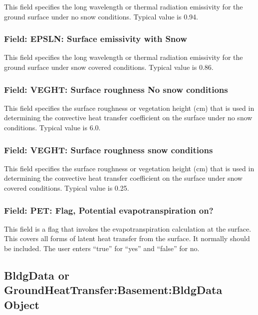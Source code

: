 This field specifies the long wavelength or thermal radiation emissivity for the ground surface under no snow conditions. Typical value is 0.94.

\subsubsection{Field: EPSLN: Surface emissivity with Snow}\label{field-epsln-surface-emissivity-with-snow}

This field specifies the long wavelength or thermal radiation emissivity for the ground surface under snow covered conditions. Typical value is 0.86.

\subsubsection{Field: VEGHT: Surface roughness No snow conditions}\label{field-veght-surface-roughness-no-snow-conditions}

This field specifies the surface roughness or vegetation height (cm) that is used in determining the convective heat transfer coefficient on the surface under no snow conditions. Typical value is 6.0.

\subsubsection{Field: VEGHT: Surface roughness snow conditions}\label{field-veght-surface-roughness-snow-conditions}

This field specifies the surface roughness or vegetation height (cm) that is used in determining the convective heat transfer coefficient on the surface under snow covered conditions. Typical value is 0.25.

\subsubsection{Field: PET: Flag, Potential evapotranspiration on?}\label{field-pet-flag-potential-evapotranspiration-on}

This field is a flag that invokes the evapotranspiration calculation at the surface. This covers all forms of latent heat transfer from the surface. It normally should be included. The user enters ``true'' for ``yes'' and ``false'' for no.

\subsection{BldgData or GroundHeatTransfer:Basement:BldgData Object}\label{bldgdata-or-groundheattransferbasementbldgdata-object}

